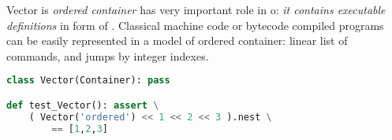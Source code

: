 \clearpage{}\label{Vector}

Vector is \emph{ordered container} has very important role in o\F: \emph{it
contains executable definitions} in form of .
Classical machine code or bytecode compiled programs can be easily represented
in a model of ordered container: linear list of commands, and jumps by integer
indexes.
\begin{lstlisting}[language=Python]
class Vector(Container): pass

def test_Vector(): assert \
	( Vector('ordered') << 1 << 2 << 3 ).nest \
		== [1,2,3]
\end{lstlisting}